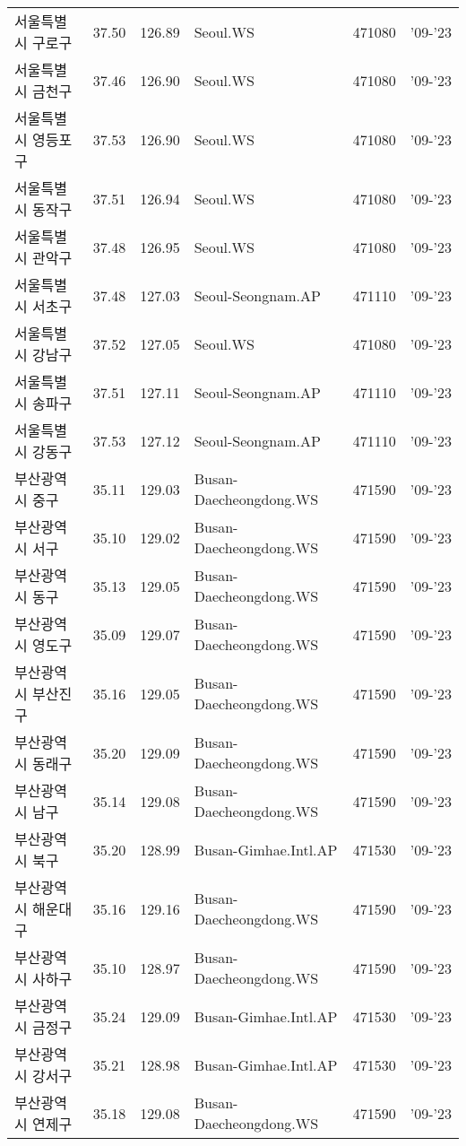 \begin{longtable}{lcclcc}
  서울특별시 구로구 & 37.50 & 126.89 & Seoul.WS & 471080 & '09-'23 \\
  서울특별시 금천구 & 37.46 & 126.90 & Seoul.WS & 471080 & '09-'23 \\
  서울특별시 영등포구 & 37.53 & 126.90 & Seoul.WS & 471080 & '09-'23 \\
  서울특별시 동작구 & 37.51 & 126.94 & Seoul.WS & 471080 & '09-'23 \\
  서울특별시 관악구 & 37.48 & 126.95 & Seoul.WS & 471080 & '09-'23 \\
  서울특별시 서초구 & 37.48 & 127.03 & Seoul-Seongnam.AP & 471110 & '09-'23 \\
  서울특별시 강남구 & 37.52 & 127.05 & Seoul.WS & 471080 & '09-'23 \\
  서울특별시 송파구 & 37.51 & 127.11 & Seoul-Seongnam.AP & 471110 & '09-'23 \\
  서울특별시 강동구 & 37.53 & 127.12 & Seoul-Seongnam.AP & 471110 & '09-'23 \\
  부산광역시 중구 & 35.11 & 129.03 & Busan-Daecheongdong.WS & 471590 & '09-'23 \\
  부산광역시 서구 & 35.10 & 129.02 & Busan-Daecheongdong.WS & 471590 & '09-'23 \\
  부산광역시 동구 & 35.13 & 129.05 & Busan-Daecheongdong.WS & 471590 & '09-'23 \\
  부산광역시 영도구 & 35.09 & 129.07 & Busan-Daecheongdong.WS & 471590 & '09-'23 \\
  부산광역시 부산진구 & 35.16 & 129.05 & Busan-Daecheongdong.WS & 471590 & '09-'23 \\
  부산광역시 동래구 & 35.20 & 129.09 & Busan-Daecheongdong.WS & 471590 & '09-'23 \\
  부산광역시 남구 & 35.14 & 129.08 & Busan-Daecheongdong.WS & 471590 & '09-'23 \\
  부산광역시 북구 & 35.20 & 128.99 & Busan-Gimhae.Intl.AP & 471530 & '09-'23 \\
  부산광역시 해운대구 & 35.16 & 129.16 & Busan-Daecheongdong.WS & 471590 & '09-'23 \\
  부산광역시 사하구 & 35.10 & 128.97 & Busan-Daecheongdong.WS & 471590 & '09-'23 \\
  부산광역시 금정구 & 35.24 & 129.09 & Busan-Gimhae.Intl.AP & 471530 & '09-'23 \\
  부산광역시 강서구 & 35.21 & 128.98 & Busan-Gimhae.Intl.AP & 471530 & '09-'23 \\
  부산광역시 연제구 & 35.18 & 129.08 & Busan-Daecheongdong.WS & 471590 & '09-'23 \\

\end{longtable}
